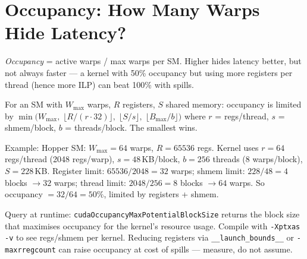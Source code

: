 \section{Occupancy: How Many Warps Hide Latency?}
\emph{Occupancy} = active warps / max warps per SM. Higher hides latency better, but not always faster --- a kernel with 50\% occupancy but using more registers per thread (hence more ILP) can beat 100\% with spills.

\begin{definition}
For an SM with $W_{\max}$ warps, $R$ registers, $S$ shared memory: occupancy is limited by $\min\bigl(W_{\max},\; \lfloor R / (r\cdot32)\rfloor,\; \lfloor S / s\rfloor,\; \lfloor B_{\max}/b\rfloor\bigr)$ where $r$ = regs/thread, $s$ = shmem/block, $b$ = threads/block. The smallest wins.
\end{definition}

Example: Hopper SM: $W_{\max}{=}64$ warps, $R{=}65536$ regs. Kernel uses $r{=}64$ regs/thread (2048 regs/warp), $s{=}48$\,KB/block, $b{=}256$ threads (8 warps/block), $S{=}228$\,KB. Register limit: $65536/2048{=}32$ warps; shmem limit: $228/48{=}4$ blocks $\to 32$ warps; thread limit: $2048/256{=}8$ blocks $\to 64$ warps. So occupancy $=32/64{=}50\%$, limited by registers + shmem.

\begin{center}
\end{center}

Query at runtime: \texttt{cudaOccupancyMaxPotentialBlockSize} returns the block size that maximises occupancy for the kernel's resource usage. Compile with \texttt{-Xptxas -v} to see regs/shmem per kernel. Reducing registers via \texttt{\_\_launch\_bounds\_\_} or \texttt{-maxrregcount} can raise occupancy at cost of spills --- measure, do not assume.

